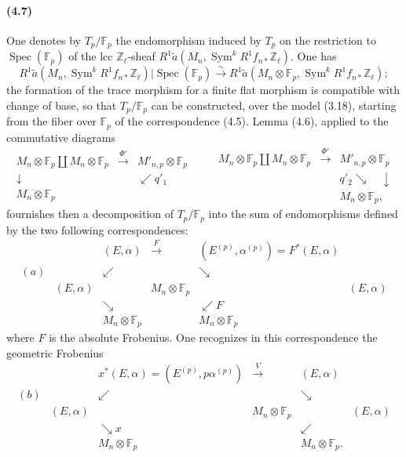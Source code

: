 \documentclass[10pt]{article}
\newcommand{\F}{\mathbb F}
\newcommand{\Z}{\mathbb Z}
\newcommand{\Spec}{\operatorname{Spec}}
\newcommand{\Sym}{\operatorname{Sym}}
\begin{document}
\paragraph{(4.7)}
One denotes by $T_p/\F_p$ the endomorphism induced by $T_p$ on the restriction to $\Spec(\F_p)$ of the lcc $\Z_\ell$-sheaf $R^1\widetilde a(M_n,\Sym^k R^1f_{n*}\Z_\ell)$. One has
\[
R^1\widetilde a(M_n,\Sym^k R^1f_{n*}\Z_\ell)|\Spec(\F_p)
\xrightarrow{\sim}
R^1\widetilde a(M_n\otimes\F_p,\Sym^k R^1f_{n*}\Z_\ell);
\]
the formation of the trace morphism for a finite flat morphism is compatible with change of base, so that $T_p/\F_p$ can be constructed, over the model (3.18), starting from the fiber over $\F_p$ of the correspondence (4.5). Lemma (4.6), applied to the commutative diagrams
\[
\begin{array}{ccc}
M_n\otimes\F_p\coprod M_n\otimes\F_p&\xrightarrow{\Phi'}&M'_{n,p}\otimes\F_p\\
\downarrow&&\swarrow q'_1\\
M_n\otimes\F_p&&
\end{array}
\qquad
\begin{array}{ccc}
M_n\otimes\F_p\coprod M_n\otimes\F_p&\xrightarrow{\Phi'}&M'_{n,p}\otimes\F_p\\
&&q'_2\searrow\quad\downarrow\\
&&M_n\otimes\F_p,
\end{array}
\]
fournishes then a decomposition of $T_p/\F_p$ into the sum of endomorphisms defined by the two following correspondences:
\[
\begin{array}{cccccc}
&& (E,\alpha)&\xrightarrow{F}&(E^{(p)},\alpha^{(p)})=F^*(E,\alpha)\\[-0.2em]
(a)&& \swarrow && \searrow\\[-0.2em]
& (E,\alpha) && M_n\otimes\F_p && (E,\alpha)\\[-0.2em]
&& \searrow && \swarrow F\\[-0.2em]
&& M_n\otimes\F_p && M_n\otimes\F_p
\end{array}
\]
where $F$ is the absolute Frobenius. One recognizes in this correspondence the geometric Frobenius
\[
\begin{array}{cccccc}
&&x^*(E,\alpha)=(E^{(p)},p\alpha^{(p)})&\xrightarrow{\ V\ }&(E,\alpha)\\[-0.2em]
(b)&& \swarrow && \searrow\\[-0.2em]
& (E,\alpha) && M_n\otimes\F_p && (E,\alpha)\\[-0.2em]
&& \searrow x && \swarrow\\[-0.2em]
&& M_n\otimes\F_p && M_n\otimes\F_p.
\end{array}
\]
\end{document}
